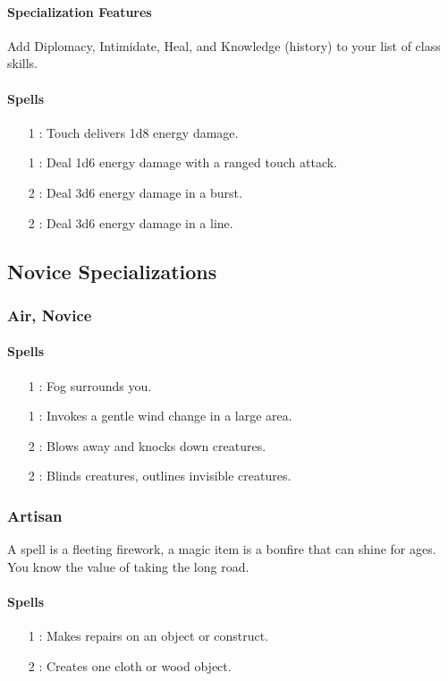 \paragraph{Specialization Features}
Add Diplomacy, Intimidate, Heal, and Knowledge (history) to your list of class skills.
\paragraph{Spells}
\begin{itemize}
 \item[1] : Touch delivers 1d8 energy damage.
 \item[1] : Deal 1d6 energy damage with a ranged touch attack.
 \item[2] : Deal 3d6 energy damage in a burst.
 \item[2] : Deal 3d6 energy damage in a line.
\end{itemize}

\subsection{Novice Specializations}
\subsubsection{Air, Novice}
\label{Spec:AirNovice}
\paragraph{Spells}
\begin{itemize}
 \item[1] : Fog surrounds you.
 \item[1] : Invokes a gentle wind change in a large area.
 \item[2] : Blows away and knocks down creatures.
 \item[2] : Blinds creatures, outlines invisible creatures.
\end{itemize}

\subsubsection{Artisan}
A spell is a fleeting firework, a magic item is a bonfire that can shine for ages. You know the value of taking the long road.
\paragraph{Spells}
\begin{itemize}
 \item[1] : Makes repairs on an object or construct.
 \item[2] : Creates one cloth or wood object.
\end{itemize}

